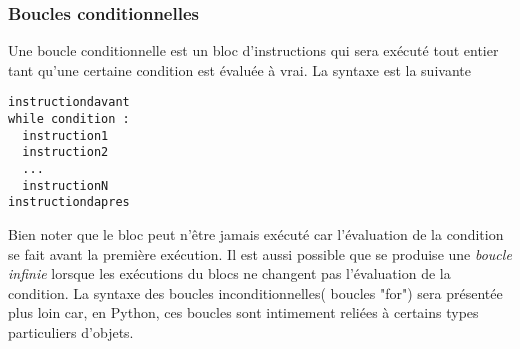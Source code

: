 \subsubsection{Boucles conditionnelles}
Une boucle conditionnelle est un bloc d'instructions qui sera exécuté tout entier tant qu'une certaine condition est évaluée à vrai. La syntaxe est la suivante
\begin{verbatim}
instructiondavant
while condition :
  instruction1
  instruction2
  ...
  instructionN
instructiondapres
\end{verbatim}
Bien noter que le bloc peut n'être jamais exécuté car l'évaluation de la condition se fait avant la première exécution. Il est aussi possible que se produise une \emph{boucle infinie} lorsque les exécutions du blocs ne changent pas l'évaluation de la condition.\newline
La syntaxe des boucles inconditionnelles( boucles "for") sera présentée plus loin car, en Python, ces boucles sont intimement reliées à certains types particuliers d'objets.

